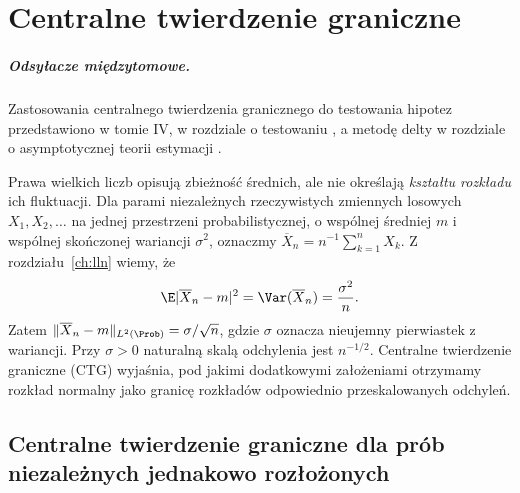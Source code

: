 \chapter{Centralne twierdzenie graniczne}
\label{ch:clt}

\providecommand{\atlasref}[2]{#2}

\paragraph{Odsyłacze międzytomowe.}
Zastosowania centralnego twierdzenia granicznego
do testowania hipotez przedstawiono w tomie IV,
w rozdziale o testowaniu%
,
a metodę delty w rozdziale o asymptotycznej teorii estymacji%
.


Prawa wielkich liczb opisują zbieżność średnich,
ale nie określają \emph{kształtu rozkładu} ich fluktuacji.
Dla parami niezależnych rzeczywistych zmiennych
losowych $X_1,X_2,\ldots$ na jednej przestrzeni
probabilistycznej, o wspólnej średniej $m$ i wspólnej
skończonej wariancji $\sigma^2$, oznaczmy
$\overline X_n=n^{-1}\sum_{k=1}^nX_k$.
Z rozdziału~\ref{ch:lln} wiemy, że
\[
\E|\overline X_n-m|^2=\Var(\overline X_n)=\frac{\sigma^2}{n}.
\]
Zatem $\|\overline X_n-m\|_{L^2(\Prob)}=\sigma/\sqrt n$,
gdzie $\sigma$ oznacza nieujemny pierwiastek z wariancji. Przy $\sigma>0$ naturalną skalą
odchylenia jest $n^{-1/2}$. Centralne twierdzenie
graniczne (CTG) wyjaśnia, pod jakimi dodatkowymi
założeniami otrzymamy rozkład normalny jako granicę
rozkładów odpowiednio przeskalowanych odchyleń.

\section{Centralne twierdzenie graniczne dla prób niezależnych jednakowo rozłożonych}

